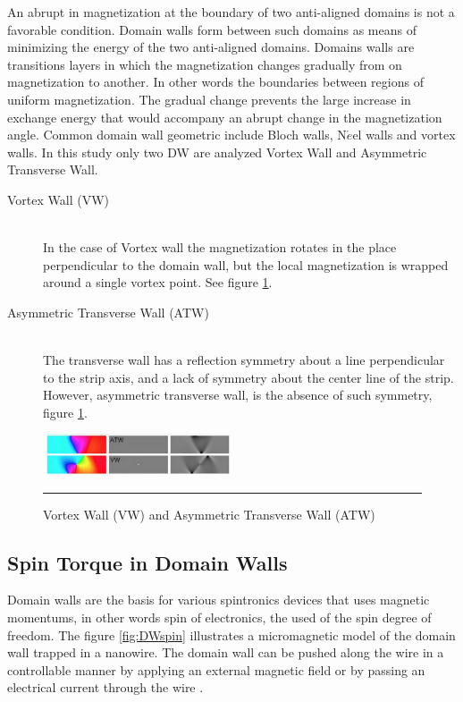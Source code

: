 An abrupt in magnetization at the boundary of two anti-aligned domains is not a favorable condition. Domain walls form between such domains as means of minimizing the energy of the two anti-aligned domains. Domains walls are transitions layers in which the magnetization changes gradually from on magnetization to another. In other words the boundaries between regions of uniform magnetization. The gradual change prevents the large increase in exchange energy that would accompany an abrupt change in the magnetization angle. Common domain wall geometric include Bloch walls, N$\acute{e}$el walls and vortex walls\cite{spindomain}. In this study only two DW are analyzed Vortex Wall and Asymmetric Transverse Wall.

\begin{description}
  \item[Vortex Wall (VW)] \hfill \\
   In the case of Vortex wall the magnetization rotates in the place perpendicular to the domain wall, but the local magnetization is wrapped around a single vortex point. See figure \ref{fig:dw}.
   
 \item[Asymmetric Transverse Wall (ATW)] \hfill \\
 The transverse wall has a reflection symmetry about a line perpendicular to the strip axis, and a lack of symmetry about the center line of the strip. However, asymmetric transverse wall, is the absence of such symmetry, figure \ref{fig:dw}.
\end{description}

\begin{figure}[htbp]
	\centering
		\includegraphics[width=0.5\textwidth]{Figures/dw.png}
		\rule{35em}{0.5pt}
	\caption[Domain Wall VW, ATW]{Vortex Wall (VW) and Asymmetric Transverse Wall (ATW)}
	\label{fig:dw}
\end{figure}

\subsection{Spin Torque in Domain Walls}

Domain walls are the basis for various spintronics devices that uses magnetic momentums, in other words spin of electronics, the used of the spin degree of freedom. The figure \ref{fig:DWspin} illustrates a micromagnetic model of the domain wall trapped in a nanowire. The domain wall can be pushed along the wire in a controllable manner by applying an external magnetic field or by passing an electrical current through the wire \cite{dwwire}.

